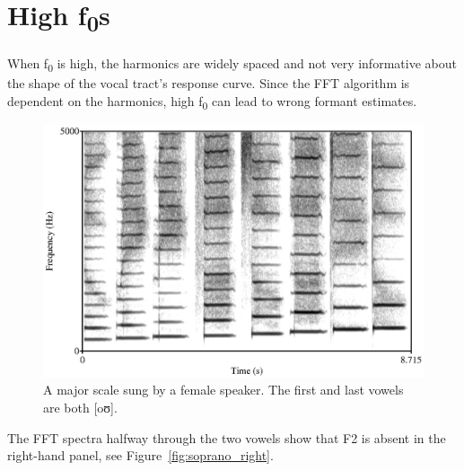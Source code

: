 \documentclass[12pt, letterpaper]{article}
\begin{document}
\section{High f\textsubscript{0}s}

When f\textsubscript{0} is high, the harmonics are widely spaced and not very informative about the shape of the vocal tract’s response curve. Since the FFT algorithm is dependent on the harmonics, high f\textsubscript{0} can lead to wrong formant estimates. 

\begin{figure}[h!]
\centering
\includegraphics[width=0.75\linewidth]{figs/soprano_major.eps}
\caption{ A major scale sung by a female speaker. The first and last vowels are both [oʊ]. }
\end{figure}

The FFT spectra halfway through the two vowels show that F2 is absent in the right-hand panel, see Figure~\ref{fig:soprano_right}.
\end{document}
